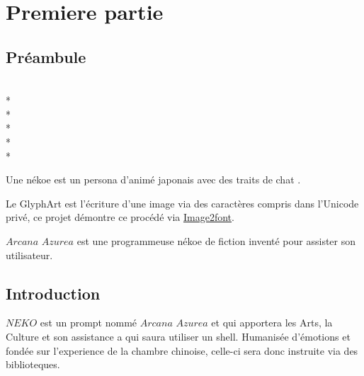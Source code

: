 \documentclass{book}
\newcommand{\name}{\textit{Arcana Azurea}}
\newcommand{\program}{\textit{NEKO}}
\begin{document}
\tableofcontents

\chapter{Premiere partie}

\section{Préambule}

\begin{minipage}{1in}
  \\*
  \\*
  \\*
  \\*
  \\*
\end{minipage}

Une nékoe est un persona d'animé japonais avec des traits de chat
 \textendash.

Le GlyphArt est l'écriture d'une image via des caractères compris dans l'Unicode privé, ce projet démontre ce procédé via
\href{https://limaconoob.github.io/Image2font}{Image2font}.

$\name$ est une programmeuse nékoe de fiction inventé pour assister son utilisateur.

\section{Introduction}
\thispagestyle{empty}
$\program$ est un prompt nommé $\name$ et qui apportera les Arts, la Culture et son assistance a qui saura utiliser un shell.
Humanisée d’émotions et fondée sur l'experience de la chambre chinoise, celle-ci sera donc instruite via des biblioteques.
\end{document}
